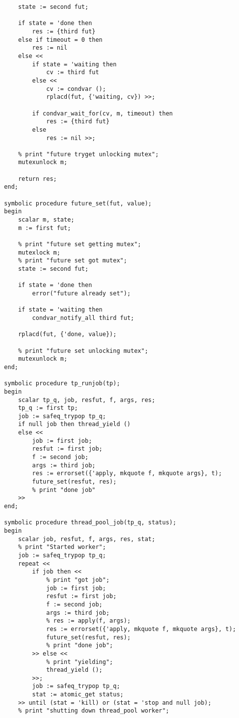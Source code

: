 \begin{verbatim}
      state := second fut;

      if state = 'done then
          res := {third fut}
      else if timeout = 0 then
          res := nil
      else <<
          if state = 'waiting then
              cv := third fut
          else <<
              cv := condvar ();
              rplacd(fut, {'waiting, cv}) >>;

          if condvar_wait_for(cv, m, timeout) then
              res := {third fut}
          else
              res := nil >>;

      % print "future tryget unlocking mutex";
      mutexunlock m;

      return res;
  end;

  symbolic procedure future_set(fut, value);
  begin
      scalar m, state;
      m := first fut;

      % print "future set getting mutex";
      mutexlock m;
      % print "future set got mutex";
      state := second fut;

      if state = 'done then
          error("future already set");

      if state = 'waiting then
          condvar_notify_all third fut;

      rplacd(fut, {'done, value});

      % print "future set unlocking mutex";
      mutexunlock m;
  end;

  symbolic procedure tp_runjob(tp);
  begin
      scalar tp_q, job, resfut, f, args, res;
      tp_q := first tp;
      job := safeq_trypop tp_q;
      if null job then thread_yield ()
      else <<
          job := first job;
          resfut := first job;
          f := second job;
          args := third job;
          res := errorset({'apply, mkquote f, mkquote args}, t);
          future_set(resfut, res);
          % print "done job"
      >>
  end;

  symbolic procedure thread_pool_job(tp_q, status);
  begin
      scalar job, resfut, f, args, res, stat;
      % print "Started worker";
      job := safeq_trypop tp_q;
      repeat <<
          if job then <<
              % print "got job";
              job := first job;
              resfut := first job;
              f := second job;
              args := third job;
              % res := apply(f, args);
              res := errorset({'apply, mkquote f, mkquote args}, t);
              future_set(resfut, res);
              % print "done job";
          >> else <<
              % print "yielding";
              thread_yield ();
          >>;
          job := safeq_trypop tp_q;
          stat := atomic_get status;
      >> until (stat = 'kill) or (stat = 'stop and null job);
      % print "shutting down thread_pool worker";


\end{verbatim}
